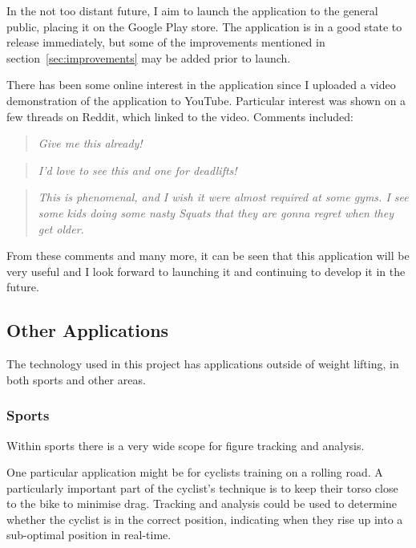 In the not too distant future, I aim to launch the application to the general public, placing it on the Google Play\cite{googleplay} store. The application is in a good state to release immediately, but some of the improvements mentioned in section~\ref{sec:improvements} may be added prior to launch.

There has been some online interest in the application since I uploaded a video demonstration of the application to YouTube\cite{youtube}. Particular interest was shown on a few threads on Reddit\cite{reddit}\cite{redditpopularity}, which linked to the video. Comments included:

\begin{quote}
\emph{Give me this already!}
\end{quote}

\begin{quote}
\emph{I'd love to see this and one for deadlifts!}
\end{quote}

\begin{quote}
\emph{This is phenomenal, and I wish it were almost required at some gyms. I see some kids doing some nasty Squats that they are gonna regret when they get older.}
\end{quote}

From these comments and many more, it can be seen that this application will be very useful and I look forward to launching it and continuing to develop it in the future.

\subsection{Other Applications}

The technology used in this project has applications outside of weight lifting, in both sports and other areas.

\subsubsection{Sports}

Within sports there is a very wide scope for figure tracking and analysis.

One particular application might be for cyclists training on a rolling road. A particularly important part of the cyclist's technique is to keep their torso close to the bike to minimise drag. Tracking and analysis could be used to determine whether the cyclist is in the correct position, indicating when they rise up into a sub-optimal position in real-time.


